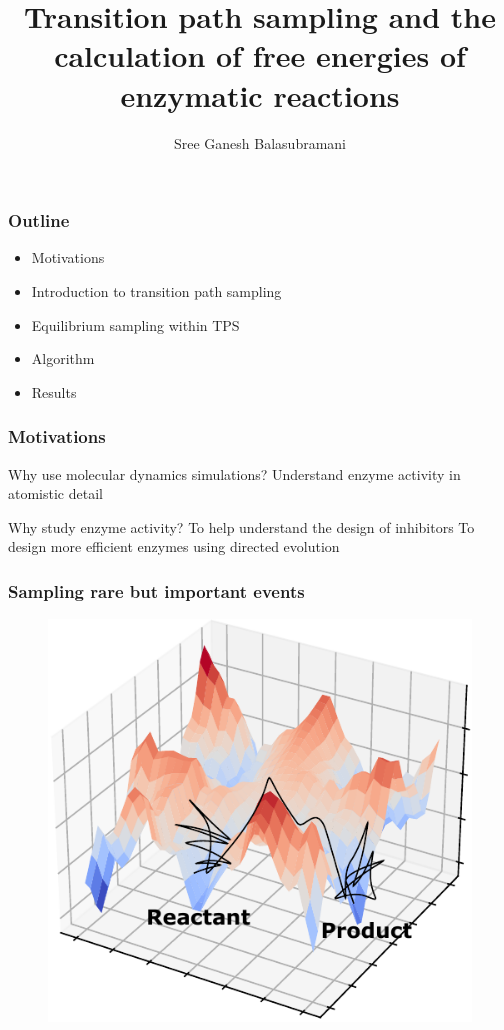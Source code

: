 \documentclass{beamer}
\title[TPS free energies]{Transition path sampling and the calculation of free energies of enzymatic reactions}
\author[Schwartz Group]{Sree Ganesh Balasubramani}
\institute[U of A]{Schwartz Group \\ Chemistry and Biochemistry \\ University of Arizona}
\date{}
\begin{document}
\begin{frame}
  \titlepage
\end{frame}
\begin{frame}
  \frametitle{Outline}
  \begin{itemize}[<+-|alert@+>]
      \item Motivations
      \item Introduction to transition path sampling 
      \item Equilibrium sampling within TPS
      \item Algorithm 
      \item Results
  \end{itemize}
\end{frame}
\begin{frame}
\frametitle{Motivations}
\begin{block}{Why use molecular dynamics simulations?}
Understand enzyme activity in atomistic detail
\end{block}
\pause
\begin{block}{Why study enzyme activity?}
To help understand the design of inhibitors 
To design more efficient enzymes using directed evolution
\end{block}

\end{frame}
\begin{frame}
\frametitle{Sampling rare but important events}
\begin{figure}
\centering
\includegraphics[scale=0.75]{figures/pot-surf.pdf}
\end{figure}
\end{frame}
\end{document}
